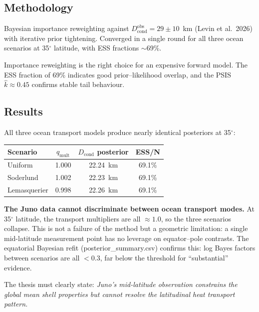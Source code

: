 \documentclass[11pt,a4paper]{article}
\begin{document}
\subsection{Methodology}

Bayesian importance reweighting against $D_\mathrm{cond}^\mathrm{obs}
= 29 \pm 10$~km (Levin et al.\ 2026) with iterative prior tightening.
Converged in a single round for all three ocean scenarios at 35$^\circ$
latitude, with ESS fractions $\sim$69\%.

\begin{strength}
Importance reweighting is the right choice for an expensive forward model.
The ESS fraction of 69\% indicates good prior--likelihood overlap, and
the PSIS $\hat{k} \approx 0.45$ confirms stable tail behaviour.
\end{strength}

\subsection{Results}

All three ocean transport models produce nearly identical posteriors at
35$^\circ$:

\begin{center}
\begin{tabular}{lccc}
\toprule
\textbf{Scenario} & $q_\mathrm{mult}$ & $D_\mathrm{cond}$ posterior & ESS/N \\
\midrule
Uniform & 1.000 & 22.24~km & 69.1\% \\
Soderlund & 1.002 & 22.23~km & 69.1\% \\
Lemasquerier & 0.998 & 22.26~km & 69.1\% \\
\bottomrule
\end{tabular}
\end{center}

\begin{critical}
\textbf{The Juno data cannot discriminate between ocean transport modes.}
At 35$^\circ$ latitude, the transport multipliers are all $\approx 1.0$,
so the three scenarios collapse. This is not a failure of the method but a
geometric limitation: a single mid-latitude measurement point has no
leverage on equator--pole contrasts. The equatorial Bayesian refit
(posterior\_summary.csv) confirms this: log Bayes factors between scenarios
are all $<0.3$, far below the threshold for ``substantial'' evidence.

The thesis must clearly state: \textit{Juno's mid-latitude observation
constrains the global mean shell properties but cannot resolve the
latitudinal heat transport pattern.}
\end{critical}
\end{document}
